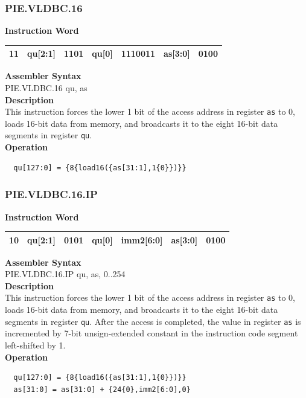 \newpage
\subsubsection{PIE.VLDBC.16}\label{instruction:PIEVLDBC16}
\setlength\tabcolsep{6pt}
\textbf{Instruction Word} \\
\begin{tabular}{|c|c|c|c|c|c|c|}
	\hline
	11 & qu[2:1] & 1101 & qu[0] & 1110011 & as[3:0] & 0100 \\
	\hline
\end{tabular}

\textbf{Assembler Syntax} \\
PIE.VLDBC.16 qu, as \\
\textbf{Description} \\
This instruction forces the lower 1 bit of the access address in register \lstinline{as} to 0, loads 16-bit data from memory, and broadcasts it to the eight 16-bit data segments in register \lstinline{qu}.\\
\textbf{Operation}
\begin{lstlisting}
  qu[127:0] = {8{load16({as[31:1],1{0}})}}
\end{lstlisting}

\newpage
\subsubsection{PIE.VLDBC.16.IP}\label{instruction:PIEVLDBC16IP}
\setlength\tabcolsep{6pt}
\textbf{Instruction Word} \\
\begin{tabular}{|c|c|c|c|c|c|c|}
	\hline
	10 & qu[2:1] & 0101 & qu[0] & imm2[6:0] & as[3:0] & 0100 \\
	\hline
\end{tabular}

\textbf{Assembler Syntax} \\
PIE.VLDBC.16.IP qu, as, 0..254 \\
\textbf{Description} \\
This instruction forces the lower 1 bit of the access address in register \lstinline{as} to 0, loads 16-bit data from memory, and broadcasts it to the eight 16-bit data segments in register \lstinline{qu}. After the access is completed, the value in register \lstinline{as} is incremented by 7-bit unsign-extended constant in the instruction code segment left-shifted by 1.\\
\textbf{Operation}
\begin{lstlisting}
  qu[127:0] = {8{load16({as[31:1],1{0}})}}
  as[31:0] = as[31:0] + {24{0},imm2[6:0],0}
\end{lstlisting}

